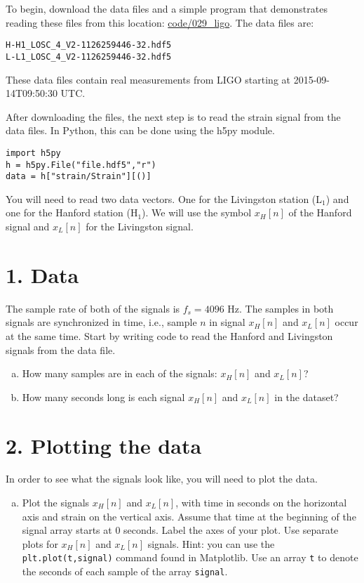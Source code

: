 To begin, download the data files and a simple program that
demonstrates reading these files from this location:
\url{code/029_ligo}. The data files are:
\begin{verbatim}
H-H1_LOSC_4_V2-1126259446-32.hdf5
L-L1_LOSC_4_V2-1126259446-32.hdf5
\end{verbatim}
These data files contain real measurements from LIGO starting at
2015-09-14T09:50:30 UTC.

After downloading the files, the next step is to read the strain
signal from the data files. In Python, this can be done using the h5py
module.
\begin{verbatim}
import h5py
h = h5py.File("file.hdf5","r")
data = h["strain/Strain"][()]
\end{verbatim}
You will need to read two data vectors. One for the Livingston station
(L$_1$) and one for the Hanford station (H$_1$). We will use the symbol $x_H[n]$
of the Hanford signal and $x_L[n]$ for the Livingston signal.

\section{1. Data}
The sample rate of both of the signals is $f_s=4096$ Hz. The samples
in both signals are synchronized in time, i.e., sample $n$ in signal
$x_H[n]$ and $x_L[n]$ occur at the same time. Start by writing code to
read the Hanford and Livingston signals from the data file.
\begin{enumerate}[a)]
  \item How many samples are in each of the signals: $x_H[n]$ and $x_L[n]$?
  \item How many seconds long is each signal $x_H[n]$ and $x_L[n]$ in
    the dataset?
\end{enumerate}

\section{2. Plotting the data}

In order to see what the signals look like, you will need to plot the data.
\begin{enumerate}[a)]
  \item Plot the signals $x_H[n]$ and $x_L[n]$, with time in seconds on
        the horizontal axis and strain on the vertical axis. Assume that
        time at the beginning of the signal array starts at $0$ seconds. Label
        the axes of your plot. Use separate plots for $x_H[n]$ and $x_L[n]$
        signals. Hint: you can use the \verb|plt.plot(t,signal)| command found
        in Matplotlib. Use an array \verb|t| to denote the seconds of each sample of the array \verb|signal|.

\end{enumerate}

